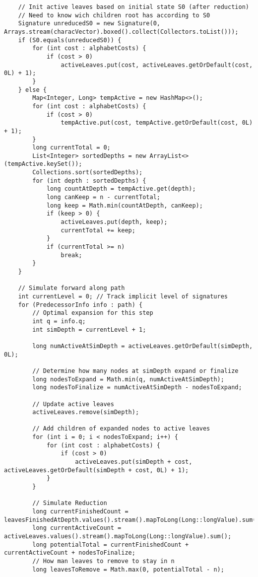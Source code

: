 \documentclass[a4paper,10pt,ngerman]{scrartcl}
\begin{document}
\begin{lstlisting}
    // Init active leaves based on initial state S0 (after reduction)
    // Need to know wich children root has according to S0
    Signature unreducedS0 = new Signature(0, Arrays.stream(characVector).boxed().collect(Collectors.toList()));
    if (S0.equals(unreducedS0)) {
        for (int cost : alphabetCosts) {
            if (cost > 0)
                activeLeaves.put(cost, activeLeaves.getOrDefault(cost, 0L) + 1);
        }
    } else {
        Map<Integer, Long> tempActive = new HashMap<>();
        for (int cost : alphabetCosts) {
            if (cost > 0)
                tempActive.put(cost, tempActive.getOrDefault(cost, 0L) + 1);
        }
        long currentTotal = 0;
        List<Integer> sortedDepths = new ArrayList<>(tempActive.keySet());
        Collections.sort(sortedDepths);
        for (int depth : sortedDepths) {
            long countAtDepth = tempActive.get(depth);
            long canKeep = n - currentTotal;
            long keep = Math.min(countAtDepth, canKeep);
            if (keep > 0) {
                activeLeaves.put(depth, keep);
                currentTotal += keep;
            }
            if (currentTotal >= n)
                break;
        }
    }

    // Simulate forward along path
    int currentLevel = 0; // Track implicit level of signatures
    for (PredecessorInfo info : path) {
        // Optimal expansion for this step
        int q = info.q;
        int simDepth = currentLevel + 1;

        long numActiveAtSimDepth = activeLeaves.getOrDefault(simDepth, 0L);

        // Determine how many nodes at simDepth expand or finalize
        long nodesToExpand = Math.min(q, numActiveAtSimDepth);
        long nodesToFinalize = numActiveAtSimDepth - nodesToExpand;

        // Update active leaves
        activeLeaves.remove(simDepth);

        // Add children of expanded nodes to active leaves
        for (int i = 0; i < nodesToExpand; i++) {
            for (int cost : alphabetCosts) {
                if (cost > 0)
                    activeLeaves.put(simDepth + cost, activeLeaves.getOrDefault(simDepth + cost, 0L) + 1);
            }
        }

        // Simulate Reduction
        long currentFinishedCount = leavesFinishedAtDepth.values().stream().mapToLong(Long::longValue).sum();
        long currentActiveCount = activeLeaves.values().stream().mapToLong(Long::longValue).sum();
        long potentialTotal = currentFinishedCount + currentActiveCount + nodesToFinalize;
        // How man leaves to remove to stay in n
        long leavesToRemove = Math.max(0, potentialTotal - n);


\end{lstlisting}
\end{document}
